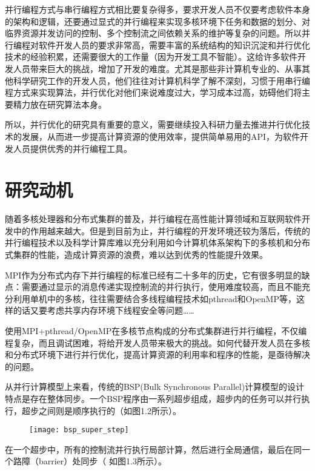 并行编程方式与串行编程方式相比要复杂得多，要求开发人员不仅要考虑软件本身的架构和逻辑，还要通过显式的并行编程来实现多核环境下任务和数据的划分、对临界资源并发访问的控制、多个控制流之间依赖关系的维护等复杂的问题。所以并行编程对软件开发人员的要求非常高，需要丰富的系统结构的知识沉淀和并行优化技术的经验积累，还需要很大的工作量（因为开发工具不智能）。这给许多软件开发人员带来巨大的挑战，增加了开发的难度。尤其是那些非计算机专业的、从事其他科学研究工作的开发人员，他们往往对计算机科学了解不深刻，习惯于用串行编程方式来实现算法，并行优化对他们来说难度过大，学习成本过高，妨碍他们将主要精力放在研究算法本身。

所以，并行优化的研究具有重要的意义，需要继续投入科研力量去推进并行优化技术的发展，从而进一步提高计算资源的使用效率，提供简单易用的API，为软件开发人员提供优秀的并行编程工具。

\section{研究动机}

随着多核处理器和分布式集群的普及，并行编程在高性能计算领域和互联网软件开发中的作用越来越大。但是到目前为止，并行编程的开发环境还较为落后，传统的并行编程技术以及科学计算库难以充分利用如今计算机体系架构下的多核机和分布式集群的性能，造成计算资源的浪费，难以达到优秀的性能提升效果。

MPI作为分布式内存下并行编程的标准已经有二十多年的历史，它有很多明显的缺点：需要通过显示的消息传递实现控制流的并行执行，使用难度较高，而且不能充分利用单机中的多核，往往需要结合多线程编程技术如pthread和OpenMP等，这样的话又要考虑共享内存环境下线程安全等问题\citep{hwu2008concurrency}……

使用MPI+pthread/OpenMP在多核节点构成的分布式集群进行并行编程，不仅编程复杂，而且调试困难，将给开发人员带来极大的挑战。如何代替开发人员在多核和分布式环境下进行并行优化，提高计算资源的利用率和程序的性能，是亟待解决的问题。

从并行计算模型上来看，传统的BSP(Bulk Synchronous Parallel)计算模型\citep{cheatham1996bulk}的设计特点是存在整体同步。一个BSP程序由一系列超步组成，超步内的任务可以并行执行，超步之间则是顺序执行的（如图1.2所示）。

\begin{figure}[!htbp]
    \centering
    \texttt{[image: bsp\_super\_step]}
    \label{fig:bsp_super_step}
\end{figure}

在一个超步中，所有的控制流并行执行局部计算，然后进行全局通信，最后在同一个路障（barrier）处同步（ 如图1.3所示）。

